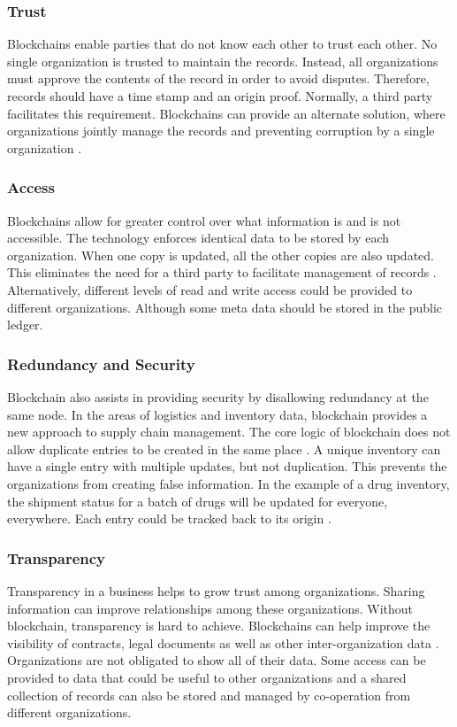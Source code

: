 \documentclass[sigconf]{acmart}
\begin{document}
\subsubsection{Trust} Blockchains enable parties that do not know each other to trust each other. No single organization is trusted to maintain the records. Instead, all organizations must approve the contents of the record in order to avoid disputes. Therefore, records should have a time stamp and an origin proof. Normally, a third party facilitates this requirement. Blockchains can provide an alternate solution, where organizations jointly manage the records and preventing corruption by a single organization \cite{arbc1}. 

\subsubsection{Access} Blockchains allow for greater control over what information is and is not accessible. The technology enforces identical data to be stored by each organization. When one copy is updated, all the other copies are also updated. This eliminates the need for a third party to facilitate management of records \cite{arbc3}. Alternatively, different levels of read and write access could be provided to different organizations. Although some meta data should be stored in the public ledger. 

\subsubsection{Redundancy and Security} Blockchain also assists in providing security by disallowing redundancy at the same node. In the areas of logistics and inventory data, blockchain provides a new approach to supply chain management. The core logic of blockchain does not allow duplicate entries to be created in the same place \cite{arbc4}. A unique inventory can have a single entry with multiple updates, but not duplication. This prevents the organizations from creating false information. In the example of a drug inventory, the shipment status for a batch of drugs will be updated for everyone, everywhere. Each entry could be tracked back to its origin \cite{arbc4}. 

\subsubsection{Transparency} Transparency in a business helps to grow trust among organizations. Sharing information can improve relationships among these organizations. Without blockchain, transparency is hard to achieve. Blockchains can help improve the visibility of contracts, legal documents as well as other inter-organization data \cite{pabc1}. Organizations are not obligated to show all of their data. Some access can be provided to data that could be useful to other organizations and a shared collection of records can also be stored and managed by co-operation from different organizations.
\end{document}
